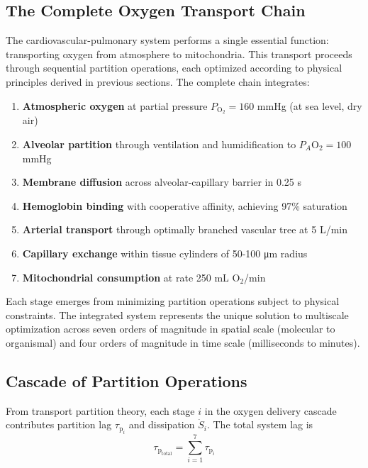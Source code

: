 \documentclass[12pt,a4paper]{article}
\theoremstyle{remark}
\newcommand{\taulag}{\tau_{\mathrm{p}}}
\begin{document}
\subsection{The Complete Oxygen Transport Chain}

The cardiovascular-pulmonary system performs a single essential function: transporting oxygen from atmosphere to mitochondria. This transport proceeds through sequential partition operations, each optimized according to physical principles derived in previous sections. The complete chain integrates:

\begin{enumerate}
\item \textbf{Atmospheric oxygen} at partial pressure $P_{\mathrm{O}_{2}} = 160$ mmHg (at sea level, dry air)
\item \textbf{Alveolar partition} through ventilation and humidification to $P_{A}\mathrm{O}_{2} = 100$ mmHg
\item \textbf{Membrane diffusion} across alveolar-capillary barrier in 0.25 s
\item \textbf{Hemoglobin binding} with cooperative affinity, achieving 97\% saturation
\item \textbf{Arterial transport} through optimally branched vascular tree at 5 L/min
\item \textbf{Capillary exchange} within tissue cylinders of 50-100 μm radius
\item \textbf{Mitochondrial consumption} at rate 250 mL O$_{2}$/min
\end{enumerate}

Each stage emerges from minimizing partition operations subject to physical constraints. The integrated system represents the unique solution to multiscale optimization across seven orders of magnitude in spatial scale (molecular to organismal) and four orders of magnitude in time scale (milliseconds to minutes).

\subsection{Cascade of Partition Operations}

From transport partition theory, each stage $i$ in the oxygen delivery cascade contributes partition lag $\taulag_{i}$ and dissipation $\dot{S}_{i}$. The total system lag is
\begin{equation}
\taulag_{\mathrm{total}} = \sum_{i=1}^{7} \taulag_{i}
\end{equation}
\end{document}
